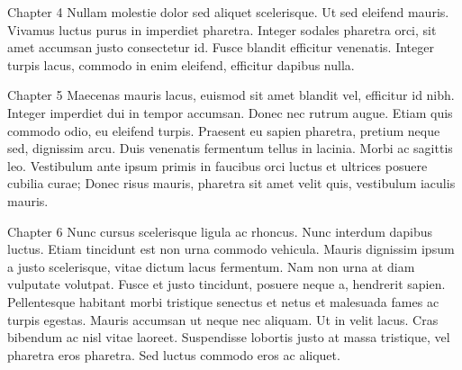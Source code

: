 Chapter 4 Nullam molestie dolor sed aliquet scelerisque. Ut sed eleifend mauris. Vivamus luctus purus in imperdiet pharetra. Integer sodales pharetra orci, sit amet accumsan justo consectetur id. Fusce blandit efficitur venenatis. Integer turpis lacus, commodo in enim eleifend, efficitur dapibus nulla.

Chapter 5 Maecenas mauris lacus, euismod sit amet blandit vel, efficitur id nibh. Integer imperdiet dui in tempor accumsan. Donec nec rutrum augue. Etiam quis commodo odio, eu eleifend turpis. Praesent eu sapien pharetra, pretium neque sed, dignissim arcu. Duis venenatis fermentum tellus in lacinia. Morbi ac sagittis leo. Vestibulum ante ipsum primis in faucibus orci luctus et ultrices posuere cubilia curae; Donec risus mauris, pharetra sit amet velit quis, vestibulum iaculis mauris.
\bigskip

Chapter 6 Nunc cursus scelerisque ligula ac rhoncus. Nunc interdum dapibus luctus. Etiam tincidunt est non urna commodo vehicula. Mauris dignissim ipsum a justo scelerisque, vitae dictum lacus fermentum. Nam non urna at diam vulputate volutpat. Fusce et justo tincidunt, posuere neque a, hendrerit sapien. Pellentesque habitant morbi tristique senectus et netus et malesuada fames ac turpis egestas. Mauris accumsan ut neque nec aliquam. Ut in velit lacus. Cras bibendum ac nisl vitae laoreet. Suspendisse lobortis justo at massa tristique, vel pharetra eros pharetra. Sed luctus commodo eros ac aliquet.
